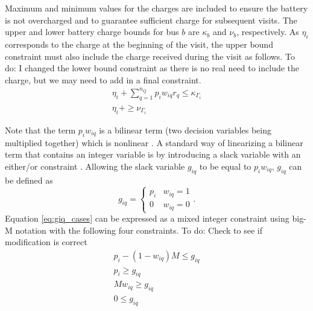 \documentclass[utf8]{FrontiersinHarvard}
\newcommand{\TODO}[1]{{\color{green} To do: #1}}                                %
\begin{document}
Maximum and minimum values for the charges are included to ensure the battery is not overcharged and to guarantee
sufficient charge for subsequent visits. The upper and lower battery charge bounds for bus $b$ are $\kappa_b$ and $\nu_b$, respectively. As $\eta_i$ corresponds to the charge at the beginning of the visit, the upper bound constraint must also include the charge received during the visit as follows.
\TODO{I changed the lower bound constraint as there is no real need to include the charge, but we may need to add in a final constraint.}
\begin{subequations}
    \label{subeq:pre_min_max}
\begin{align}
    \eta_i + \sum_{q=1}^{n_Q} p_i w_{iq} r_q \leq \kappa_{\Gamma_i}                 \\
    \eta_i + \geq \nu_{\Gamma_i}
\end{align}
\end{subequations}

Note that the term $p_i w_{iq}$ is a bilinear term (two decision variables being multiplied together) which is nonlinear
\citep{Rodriguez2013}. A standard way of linearizing a bilinear term that contains an integer variable is by introducing a slack variable with an either/or constraint \citep{Chen2010,Rodriguez2013}. Allowing
the slack variable $g_{iq}$ to be equal to $p_i w_{iq}$, $g_{iq}$ can be defined as
\begin{equation}
    \label{eq:giq_cases}
    g_{iq} =
    \begin{cases}
        p_i & w_{iq} = 1 \\
        0 & w_{iq} = 0
    \end{cases}.
\end{equation}
Equation \eqref{eq:giq_cases} can be expressed as a mixed integer constraint using big-M notation with the following four constraints. \TODO{Check to see if modification is correct}
\begin{subequations}
    \label{eq:slack_gain}
\begin{align}
    p_i - (1 - w_{iq})M \leq g_{iq}  \label{subeq:repgpgret} \\
    p_i \geq g_{iq}                 \label{subeq:repgples} \\
    Mw_{iq} \geq g_{iq}              \label{subeq:repgwgret} \\
    0 \leq g_{iq}                   \label{subeq:repgwles}
\end{align}
\end{subequations}
\end{document}
